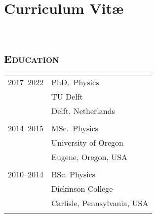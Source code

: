 \chapter*{Curriculum Vit\ae}


\makeatletter
\begin{center}
    {\Large\titlefont\bfseries\@firstname\ {\titleshape\@lastname}}
\end{center}
\makeatother

\noindent
\section*{\textsc{Education}}
\begin{tabular}{p{}l}
    2017--2022 & PhD.\ Physics \\
               & TU Delft\\
               & Delft, Netherlands \\
    \\
    2014--2015 & MSc.\ Physics \\
               & University of Oregon \\
               & Eugene, Oregon, USA \\
    \\
    2010--2014 & BSc. Physics \\
               & Dickinson College \\
               & Carlisle, Pennsylvania, USA \\
    \\
\end{tabular}


